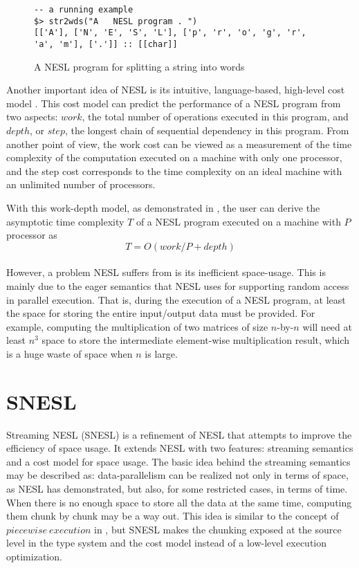 \begin{figure}[H]
 
\begin{lstlisting}[style=nesl-style]
-- a running example
$> str2wds("A   NESL program . ")
[['A'], ['N', 'E', 'S', 'L'], ['p', 'r', 'o', 'g', 'r', 'a', 'm'], ['.']] :: [[char]]
\end{lstlisting}
\caption{{A NESL program for splitting a string into words \label{fig-nesl-wordpart}}}
\end{figure}


Another important idea of NESL is its intuitive, language-based, high-level cost model \cite{blel96cost}.
This cost model can predict the performance of a NESL program from two aspects: $work$, the total number of operations executed in this program, and $depth$, or $step$, the longest chain of sequential dependency in this program.
From another point of view, the work cost can be viewed as a measurement of the time complexity of the computation executed on a machine with only one processor,
and the step cost corresponds to the time complexity on an ideal machine with an unlimited number of processors. 

With this work-depth model, as demonstrated in \cite{Blel90vecmod},   the user can derive the asymptotic time complexity $T$ of a NESL program executed on a machine with $P$ processor as 
$$ T = O(work/P + depth) $$ \\


However, a problem NESL suffers from is its inefficient space-usage.
This is mainly due to the eager semantics that NESL uses for supporting random access in parallel execution.
That is, during the execution of a NESL program, at least the space for storing the entire input/output data must be provided.
For example, computing the multiplication of two matrices of size $n$-by-$n$ will need at least $n^3$ space to store the intermediate element-wise multiplication result, which is a huge waste of space when $n$ is large.

\section{SNESL}
Streaming NESL (SNESL) \cite{Fphd} is a refinement of NESL
that attempts to improve the efficiency of space usage. 
It extends NESL with two features: streaming semantics and a cost model for space usage. 
The basic idea behind the streaming semantics may be described as:
data-parallelism can be realized not only in terms of space, as NESL has demonstrated, but also, for some restricted cases, in terms of time. 
When there is no enough space to store all the data at the same time, computing them chunk by chunk may be a way out.
This idea is similar to the concept of $piecewise \ execution$ in \cite{palm95}, but SNESL makes the chunking exposed at the source level in the type system and the cost model instead of a low-level execution optimization.

